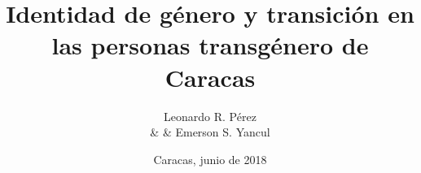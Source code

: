 \documentclass[12pt,letterpaper,twoside,openright,oldfontcommands]{memoir}
\author{Leonardo R. Pérez \\ & & Emerson S. Yancul}
\date{Caracas, junio de 2018}
\title{Identidad de género y transición en las personas transgénero de Caracas}
\begin{document}
    \maketitle
    \nocite{*}
    \frontmatter
    
    \cleardoublepage\tableofcontents
    \clearpage\listoftables*
    \listoffigures*
    \mainmatter
    
    
    
    
    
    
    \printbibliography\
\end{document}
